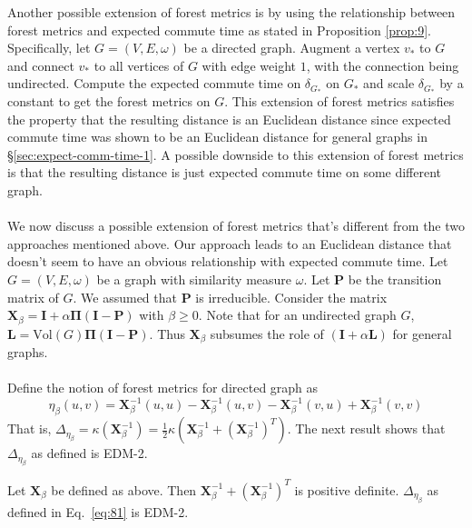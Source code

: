 Another possible extension of forest metrics is by using the
relationship between forest metrics and expected commute time as
stated in Proposition \ref{prop:9}. Specifically, let $G =
(V,E,\omega)$ be a directed graph. Augment a vertex $v_{*}$ to $G$ and
connect $v_{*}$ to all vertices of $G$ with edge weight $1$, with the
connection being undirected. Compute the expected commute time on
$\delta_{G_{*}}$ on $G_*$ and scale $\delta_{G_{*}}$ by a constant to
get the forest metrics on $G$. This extension of forest metrics
satisfies the property that the resulting distance is an Euclidean
distance since expected commute time was shown to be an Euclidean
distance for general graphs in \S \ref{sec:expect-comm-time-1}. A
possible downside to this extension of forest metrics is that the
resulting distance is just expected commute time on some
different graph. \\ \\  
%
%
\noindent 
We now discuss a possible extension of forest metrics that's different
from the two approaches mentioned above. Our approach leads to an
Euclidean distance that doesn't seem to have an obvious relationship
with expected commute time. Let $G = (V,E,\omega)$ be a graph with
similarity measure $\omega$. Let $\mathbf{P}$ be the transition matrix
of $G$. We assumed that $\mathbf{P}$ is irreducible. Consider the
matrix $\mathbf{X}_{\beta} = \mathbf{I} + \alpha \bm{\Pi}(\mathbf{I} -
\mathbf{P})$ with $\beta \geq 0$. Note that for an undirected graph
$G$, $\mathbf{L} = \mathrm{Vol}(G) \bm{\Pi}(\mathbf{I} -
\mathbf{P})$. Thus $\mathbf{X}_{\beta}$ subsumes the role of
$(\mathbf{I} + \alpha \mathbf{L})$ for general graphs. \\ \\
%
%
Define the notion of forest metrics for directed graph as
\begin{equation}
  \label{eq:81}
  \eta_{\beta}(u,v) = \mathbf{X}_\beta^{-1}(u,u) - \mathbf{X}_\beta^{-1}(u,v) -
  \mathbf{X}_\beta^{-1}(v,u) + \mathbf{X}_\beta^{-1}(v,v) 
\end{equation}
That is, $\Delta_{\eta_{\beta}} = \kappa(\mathbf{X}_\beta^{-1}) =
\tfrac{1}{2}\kappa(\mathbf{X}_\beta^{-1} +
(\mathbf{X}_{\beta}^{-1})^{T})$. The next result shows that
$\Delta_{\eta_{\beta}}$ as defined is EDM-2.
\begin{proposition}
  \label{prop:23}
  Let $\mathbf{X}_{\beta}$ be defined as above. Then
  $\mathbf{X}_{\beta}^{-1} + (\mathbf{X}_{\beta}^{-1})^{T}$ is
  positive definite. $\Delta_{\eta_{\beta}}$ as defined in
  Eq.~\eqref{eq:81} is EDM-2.
\end{proposition}
